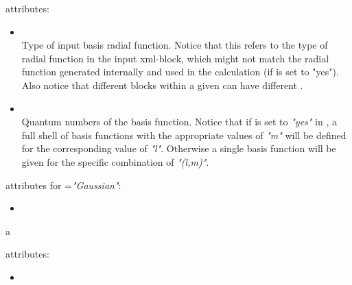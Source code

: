 attributes:

\begin{itemize}
\item {}\\
  Type of input basis radial function. Notice that this refers to the type of radial function in the input xml-block, which might not match the radial function generated internally and used in the calculation (if  is set to "yes"). Also notice that different  blocks within a given  can have different .
\item {}\\
  Quantum numbers of the basis function. Notice that if  is set to \textit{"yes"} in , a full shell of basis functions with the appropriate values of \textit{"m"} will be defined for the corresponding value of \textit{"l"}. Otherwise a single basis function will be given for the specific combination of \textit{"(l,m)"}. 
\end{itemize}

 attributes for =\textit{"Gaussian"}:

\begin{itemize}
\item {}\\
\end{itemize}a

 attributes:

\begin{itemize}
\item {}\\
\end{itemize}




